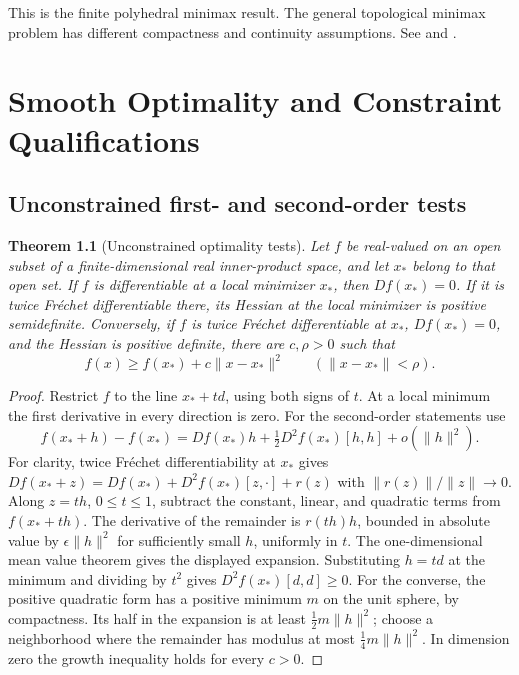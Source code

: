 \documentclass[11pt,oneside,openany]{book}
\theoremstyle{plain}
\newtheorem{theorem}{Theorem}[chapter]
\theoremstyle{definition}
\theoremstyle{remark}
\begin{document}
This is the finite polyhedral minimax result. The
general topological minimax problem has different
compactness and continuity assumptions.
See \cite[Sections 36--37]{Rockafellar} and
\cite[Chapter VI]{EkelandTemam}.
\chapter{Smooth Optimality and Constraint Qualifications}

\section{Unconstrained first- and second-order tests}
\label{v06-01}

\begin{theorem}[Unconstrained optimality tests]\label{thm:unconstrained-tests}
Let \(f\) be real-valued on an open subset of a
finite-dimensional real inner-product space,
and let \(x_*\) belong to that open set.
If \(f\) is differentiable at a local minimizer \(x_*\),
then \(Df(x_*)=0\).
If it is twice Fr\'echet differentiable there, its
Hessian at the local minimizer is positive semidefinite.
Conversely, if \(f\) is twice Fr\'echet differentiable at \(x_*\),
\(Df(x_*)=0\), and the Hessian is positive definite,
there are \(c,\rho>0\) such that
\[
 f(x)\ge f(x_*)+c\|x-x_*\|^2
 \qquad(\|x-x_*\|<\rho).
\]
\end{theorem}

\begin{proof}
Restrict \(f\) to the line \(x_*+td\), using
both signs of \(t\). At a local minimum the first
derivative in every direction is zero.
For the second-order statements use
\[
 f(x_*+h)-f(x_*)=Df(x_*)h+
           \tfrac12D^2f(x_*)[h,h]+o(\|h\|^2).
\]
For clarity, twice Fr\'echet differentiability at
\(x_*\) gives
\(Df(x_*+z)=Df(x_*)+D^2f(x_*)[z,\cdot]+r(z)\)
with \(\|r(z)\|/\|z\|\to0\).
Along \(z=th\), \(0\le t\le1\), subtract
the constant, linear, and quadratic terms from
\(f(x_*+th)\). The derivative of the remainder is
\(r(th)h\), bounded in absolute value by
\(\epsilon\|h\|^2\) for sufficiently small \(h\),
uniformly in \(t\). The one-dimensional mean value
theorem gives the displayed expansion. Substituting
\(h=td\) at the minimum and dividing by \(t^2\)
gives \(D^2f(x_*)[d,d]\ge0\).
For the converse, the positive quadratic form has
a positive minimum \(m\) on the unit sphere,
by compactness. Its half in the expansion is at
least \(\tfrac12m\|h\|^2\); choose a neighborhood
where the remainder has modulus at most
\(\tfrac14m\|h\|^2\). In dimension zero the growth
inequality holds for every \(c>0\).
\end{proof}
\end{document}
